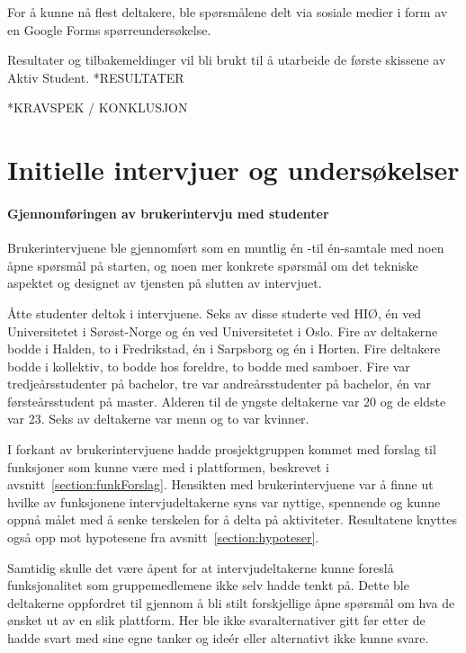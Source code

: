 For å kunne nå flest deltakere, ble spørsmålene delt via sosiale medier i form av en Google Forms spørreundersøkelse.

Resultater og tilbakemeldinger vil bli brukt til å utarbeide de første skissene av Aktiv Student. 
*RESULTATER

*KRAVSPEK / KONKLUSJON

\section{Initielle intervjuer og undersøkelser}
\label{section:init-brukerintervjuer}

\paragraph{Gjennomføringen av brukerintervju med studenter}
Brukerintervjuene ble gjennomført som en muntlig én -til én-samtale med noen åpne spørsmål på starten, og noen mer konkrete spørsmål om det tekniske aspektet og designet av tjensten på slutten av intervjuet. 

Åtte studenter deltok i intervjuene. Seks av disse studerte ved HIØ, én ved Universitetet i Sørøst-Norge og én ved Universitetet i Oslo. Fire av deltakerne bodde i Halden, to i Fredrikstad, én i Sarpsborg og én i Horten. Fire deltakere bodde i kollektiv, to bodde hos foreldre, to bodde med samboer. Fire var tredjeårsstudenter på bachelor, tre var andreårsstudenter på bachelor, én var førsteårsstudent på master. Alderen til de yngste deltakerne var 20 og de eldste var 23. Seks av deltakerne var menn og to var kvinner.

I forkant av brukerintervjuene hadde prosjektgruppen kommet med forslag til funksjoner som kunne være med i plattformen, beskrevet i avsnitt~\ref{section:funkForslag}. Hensikten med brukerintervjuene var å finne ut hvilke av funksjonene intervjudeltakerne syns var nyttige, spennende og kunne oppnå målet med å senke terskelen for å delta på aktiviteter. Resultatene knyttes også opp mot hypotesene fra avsnitt~\ref{section:hypoteser}.

Samtidig skulle det være åpent for at intervjudeltakerne kunne foreslå funksjonalitet som gruppemedlemene ikke selv hadde tenkt på. Dette ble deltakerne oppfordret til gjennom å bli stilt forskjellige åpne spørsmål om hva de ønsket ut av en slik plattform. Her ble ikke svaralternativer gitt før etter de hadde svart med sine egne tanker og ideér eller alternativt ikke kunne svare.

